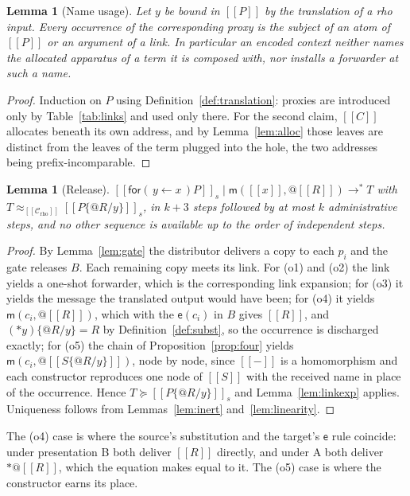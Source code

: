 \documentclass[11pt]{article}
\makeatletter
\theoremstyle{plain}
\newtheorem{lemma}[theorem]{Lemma}
\theoremstyle{definition}
\theoremstyle{remark}
\newcommand{\quo}[1]{@#1}
\newcommand{\drp}[1]{{*}#1}
\newcommand{\inp}[3]{\mathsf{for}(\,#1 \leftarrow #2\,)#3}
\newcommand{\enc}[1]{[\![#1]\!]}
\newcommand{\Ctx}{\mathscr{C}}
\newcommand{\bisim}{\approx}
\newcommand{\mm}{\mathsf{m}}
\newcommand{\ev}{\mathsf{e}}
\newcommand{\wred}{\longrightarrow^{*}}
\makeatother
\begin{document}
\begin{lemma}[Name usage]
\label{lem:usage}
Let $y$ be bound in $\enc{P}$ by the translation of a rho input. Every
occurrence of the corresponding proxy is the subject of an atom of $\enc{P}$
or an argument of a link. In particular an encoded context neither names the
allocated apparatus of a term it is composed with, nor installs a forwarder
at such a name.
\end{lemma}

\begin{proof}
Induction on $P$ using Definition~\ref{def:translation}: proxies are
introduced only by Table~\ref{tab:links} and used only there. For the second
claim, $\enc{C}$ allocates beneath its own address, and by
Lemma~\ref{lem:alloc} those leaves are distinct from the leaves of the term
plugged into the hole, the two addresses being prefix-incomparable.
\end{proof}

\begin{lemma}[Release]
\label{lem:release}
$\enc{\inp{y}{x}{P}}_{s} \mid \mm(\enc{x},\quo{\enc{R}}) \wred T$ with
$T \bisim_{\enc{\Ctx_{\mathrm{rho}}}} \enc{P\{\quo{R}/y\}}_{s}$, in $k+3$
steps followed by at most $k$ administrative steps, and no other sequence is
available up to the order of independent steps.
\end{lemma}

\begin{proof}
By Lemma~\ref{lem:gate} the distributor delivers a copy to each $p_{i}$ and
the gate releases $B$. Each remaining copy meets its link. For (o1) and (o2)
the link yields a one-shot forwarder, which is the corresponding link
expansion; for (o3) it yields the message the translated output would have
been; for (o4) it yields $\mm(c_{i},\quo{\enc{R}})$, which with the $\ev(c_{i})$
in $B$ gives $\enc{R}$, and $(\drp{y})\{\quo{R}/y\} = R$ by
Definition~\ref{def:subst}, so the occurrence is discharged exactly; for (o5)
the chain of Proposition~\ref{prop:four} yields
$\mm(c_{i},\quo{\enc{S\{\quo{R}/y\}}})$, node by node, since $\enc{-}$ is a
homomorphism and each constructor reproduces one node of $\enc{S}$ with the
received name in place of the occurrence.
Hence $T \succeq \enc{P\{\quo{R}/y\}}_{s}$ and
Lemma~\ref{lem:linkexp} applies. Uniqueness follows from
Lemmas~\ref{lem:inert} and~\ref{lem:linearity}.
\end{proof}

The (o4) case is where the source's substitution and the target's $\ev$ rule
coincide: under presentation B both deliver $\enc{R}$ directly, and under A
both deliver $\drp{\quo{\enc{R}}}$, which the equation makes equal to it. The (o5) case is where the constructor earns its place.
\end{document}
